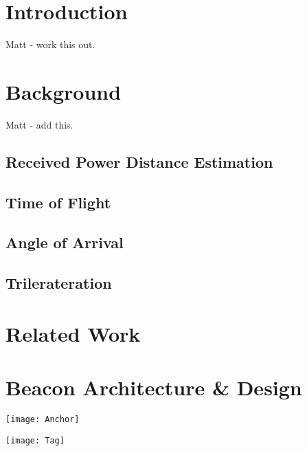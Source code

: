 \documentclass[sigconf]{acmart}
\begin{document}

\maketitle

\section{Introduction}

Matt - work this out. 

\section{Background}

Matt - add this. 

\subsection{Received Power Distance Estimation}

\subsection{Time of Flight}

\subsection{Angle of Arrival}

\subsection{Trilerateration}

\section{Related Work}

\section{Beacon Architecture \& Design}

\texttt{[image: Anchor]}

\texttt{[image: Tag]}
\end{document}
